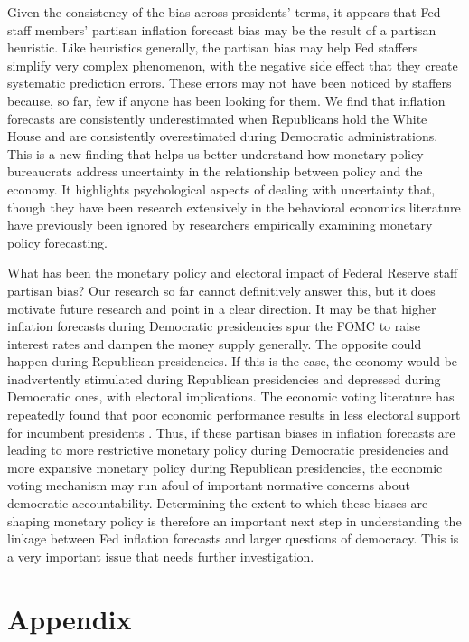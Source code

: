 \documentclass[a4paper]{article}\usepackage{graphicx, color}
\begin{document}
Given the consistency of the bias across presidents' terms, it appears that Fed staff members' partisan inflation forecast bias may be the result of a partisan heuristic. Like heuristics generally, the partisan bias may help Fed staffers simplify very complex phenomenon, with the negative side effect that they create systematic prediction errors. These errors may not have been noticed by staffers because, so far, few if anyone has been looking for them. We find that inflation forecasts are consistently underestimated when Republicans hold the White House and are consistently overestimated during Democratic administrations. This is a new finding that helps us better understand how monetary policy bureaucrats address uncertainty in the relationship between policy and the economy. It highlights psychological aspects of dealing with uncertainty that, though they have been research extensively in the behavioral economics literature \citep{kahneman1973, tverskykahneman1974, kahneman2003} have previously been ignored by researchers empirically examining monetary policy forecasting.

What has been the monetary policy and electoral impact of Federal Reserve staff partisan bias? Our research so far cannot definitively answer this, but it does motivate future research and point in a clear direction. It may be that higher inflation forecasts during Democratic presidencies spur the FOMC to raise interest rates and dampen the money supply generally. The opposite could happen during Republican presidencies. If this is the case, the economy would be inadvertently stimulated during Republican presidencies and depressed during Democratic ones, with electoral implications. The economic voting literature has repeatedly found that poor economic performance results in less electoral support for incumbent presidents \citep[e.g.][]{Alvarez1998, Bloom1975, LewisBeck1988, Powell1993}. Thus, if these partisan biases in inflation forecasts are leading to more restrictive monetary policy during Democratic presidencies and more expansive monetary policy during Republican presidencies, the economic voting mechanism may run afoul of important normative concerns about democratic accountability. Determining the extent to which these biases are shaping monetary policy is therefore an important next step in understanding the linkage between Fed inflation forecasts and larger questions of democracy. This is a very important issue that needs further investigation.

\clearpage
\section*{Appendix}
\end{document}
